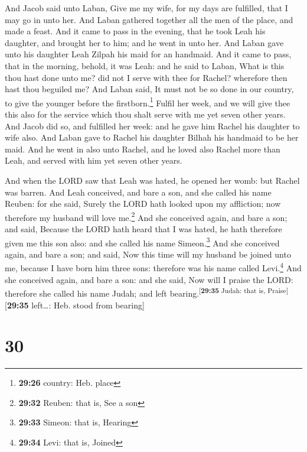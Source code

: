  And Jacob said unto Laban, Give me my wife, for my days
are fulfilled, that I may go in unto her.  And Laban
gathered together all the men of the place, and made a feast.
 And it came to pass in the evening, that he took Leah
his daughter, and brought her to him; and he went in unto her.
 And Laban gave unto his daughter Leah Zilpah his maid
for an handmaid.  And it came to pass, that in the
morning, behold, it was Leah: and he said to Laban, What is this thou
hast done unto me? did not I serve with thee for Rachel? wherefore then
hast thou beguiled me?  And Laban said, It must not be so
done in our country, to give the younger before the
firstborn.\footnote{\textbf{29:26} country: Heb. place} 
Fulfil her week, and we will give thee this also for the service which
thou shalt serve with me yet seven other years.  And
Jacob did so, and fulfilled her week: and he gave him Rachel his
daughter to wife also.  And Laban gave to Rachel his
daughter Bilhah his handmaid to be her maid.  And he went
in also unto Rachel, and he loved also Rachel more than Leah, and served
with him yet seven other years.

 And when the LORD saw that Leah was hated, he opened her
womb: but Rachel was barren.  And Leah conceived, and
bare a son, and she called his name Reuben: for she said, Surely the
LORD hath looked upon my affliction; now therefore my husband will love
me.\footnote{\textbf{29:32} Reuben: that is, See a son} 
And she conceived again, and bare a son; and said, Because the LORD hath
heard that I was hated, he hath therefore given me this son also: and
she called his name Simeon.\footnote{\textbf{29:33} Simeon: that is,
  Hearing}  And she conceived again, and bare a son; and
said, Now this time will my husband be joined unto me, because I have
born him three sons: therefore was his name called Levi.\footnote{\textbf{29:34}
  Levi: that is, Joined}  And she conceived again, and
bare a son: and she said, Now will I praise the LORD: therefore she
called his name Judah; and left
bearing.\textsuperscript{{[}\textbf{29:35} Judah: that is,
Praise{]}}{[}\textbf{29:35} left\ldots: Heb. stood from bearing{]}

\hypertarget{section-29}{%
\section{30}\label{section-29}}

